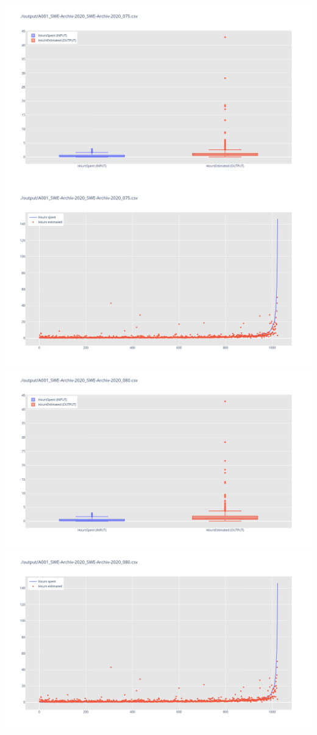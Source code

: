 \includegraphics[width=\textwidth]{Scripts/output/A001_SWE-Archiv-2020_SWE-Archiv-2020_075.csv.png}
\includegraphics[width=\textwidth]{Scripts/output/A001_SWE-Archiv-2020_SWE-Archiv-2020_075.csv.scatter.png}
\includegraphics[width=\textwidth]{Scripts/output/A001_SWE-Archiv-2020_SWE-Archiv-2020_080.csv.png}
\includegraphics[width=\textwidth]{Scripts/output/A001_SWE-Archiv-2020_SWE-Archiv-2020_080.csv.scatter.png}

